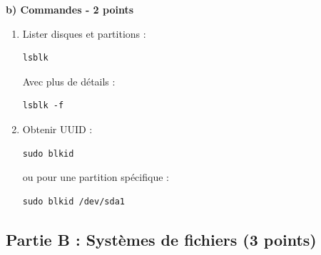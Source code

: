 \documentclass[12pt,a4paper]{article}
\begin{document}
\begin{answerbox}
\textbf{b) Commandes - 2 points}

\begin{enumerate}
    \item Lister disques et partitions :
    \begin{lstlisting}
lsblk
    \end{lstlisting}
    
    Avec plus de détails :
    \begin{lstlisting}
lsblk -f
    \end{lstlisting}
    
    \item Obtenir UUID :
    \begin{lstlisting}
sudo blkid
    \end{lstlisting}
    
    ou pour une partition spécifique :
    \begin{lstlisting}
sudo blkid /dev/sda1
    \end{lstlisting}
\end{enumerate}
\end{answerbox}

\subsection*{Partie B : Systèmes de fichiers (3 points)}
\end{document}
